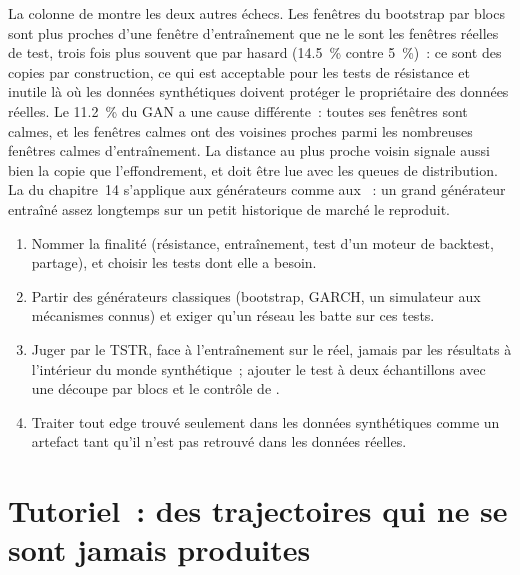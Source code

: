 La colonne de  montre les deux autres échecs. Les fenêtres du bootstrap par blocs sont plus proches d'une fenêtre d'entraînement que
ne le sont les fenêtres réelles de test, trois fois plus souvent que par hasard (14.5~\% contre 5~\%)~: ce sont des copies par construction, ce qui
est acceptable pour les tests de résistance et inutile là où les données synthétiques doivent protéger le propriétaire des données réelles. Le 11.2~\% du GAN a une
cause différente~: toutes ses fenêtres sont calmes, et les fenêtres calmes ont des voisines proches parmi les nombreuses fenêtres calmes d'entraînement.
La distance au plus proche voisin signale aussi bien la copie que l'effondrement, et doit être lue avec les queues de distribution.
La  du chapitre~14 s'applique aux générateurs comme aux ~: un grand générateur entraîné assez longtemps sur un petit historique de marché
le reproduit.

\begin{method}\label{met:ml:gen:method}
\begin{enumerate}
\item Nommer la finalité (résistance, entraînement, test d'un moteur de backtest, partage), et choisir les tests dont elle a besoin.
\item Partir des générateurs classiques (bootstrap, GARCH, un simulateur aux mécanismes connus) et exiger qu'un réseau les
batte sur ces tests.
\item Juger par le TSTR, face à l'entraînement sur le réel, jamais par les résultats à l'intérieur du monde synthétique~; ajouter le test à deux échantillons avec une
découpe par blocs et le contrôle de .
\item Traiter tout edge trouvé seulement dans les données synthétiques comme un artefact tant qu'il n'est pas retrouvé dans les données réelles.
\end{enumerate}
\end{method}

\section{Tutoriel~: des trajectoires qui ne se sont jamais produites}\label{tut:ml:generative-models-and-synthetic-data:tut}

